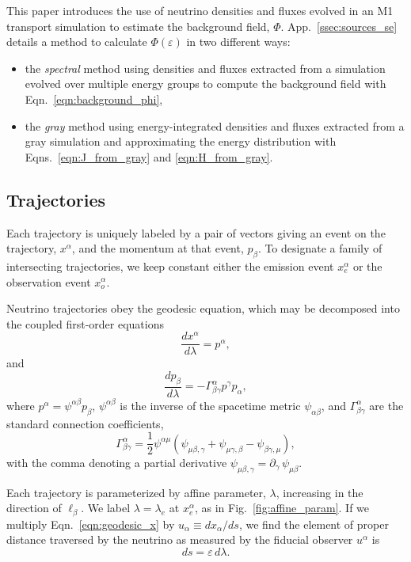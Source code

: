\documentclass[aps,floatfix,prd,superscriptaddress,twocolumn]{revtex4-1}
\begin{document}
This paper introduces the use of neutrino densities and fluxes evolved in an
M1 transport simulation to estimate the background field, $\Phi$.
App.~\ref{ssec:sources_se} details a method to calculate
$\Phi(\varepsilon)$ in two different ways:
\begin{itemize}
\item
  the \emph{spectral} method using densities and fluxes
  extracted from a simulation evolved over multiple energy groups
  to compute the background field with Eqn.~\ref{eqn:background_phi},
\item
  the \emph{gray} method using energy-integrated densities and fluxes
  extracted from a gray simulation and approximating the
  energy distribution with Eqns.~\ref{eqn:J_from_gray} and
  \ref{eqn:H_from_gray}.
\end{itemize}

\subsection{Trajectories}
\label{ssec:trajectories}
Each trajectory is uniquely labeled by a pair of vectors
giving an event on the trajectory, $x^\alpha$,
and the momentum at that event, $p_\beta$.
To designate a family of intersecting trajectories, we keep constant either
the emission event $x^\alpha_e$ or
the observation event $x^\alpha_o$.

Neutrino trajectories obey the geodesic equation, which may be decomposed into
the coupled first-order equations
\begin{equation}
\label{eqn:geodesic_x}
  \frac{d x^\alpha}{d\lambda} = p^\alpha,
\end{equation}
and
\begin{equation}
\label{eqn:geodesic_p}
  \frac{d p_\beta}{d\lambda} = -\Gamma^\alpha_{\beta\gamma} p^\gamma p_\alpha,
\end{equation}
where $p^\alpha=\psi^{\alpha\beta}p_\beta$,
$\psi^{\alpha\beta}$ is the inverse of the spacetime metric $\psi_{\alpha\beta}$,
and $\Gamma^\alpha_{\beta\gamma}$ are the standard connection coefficients,
\begin{equation}
  \label{eqn:christoffel}
  \Gamma^\alpha_{\beta\gamma} =
  \frac{1}{2} \psi^{\alpha\mu}
  (\psi_{\mu\beta,\gamma} + \psi_{\mu\gamma,\beta} - \psi_{\beta\gamma,\mu}),
\end{equation}
with the comma denoting a partial derivative
$\psi_{\mu\beta,\gamma}=\partial_\gamma\,\psi_{\mu\beta}$.

Each trajectory is parameterized by affine parameter, $\lambda$, increasing in
the direction of $\ell_\beta$. We label $\lambda=\lambda_e$ at $x^\alpha_e$,
as in Fig.~\ref{fig:affine_param}.
If we multiply Eqn.~\ref{eqn:geodesic_x} by $u_\alpha \equiv dx_\alpha/ds$,
we find the element of proper distance traversed by the
neutrino as measured by the fiducial observer $u^\alpha$ is
\begin{equation}
  \label{eqn:proper_length}
  ds=\varepsilon \,d\lambda.
\end{equation}
\end{document}
